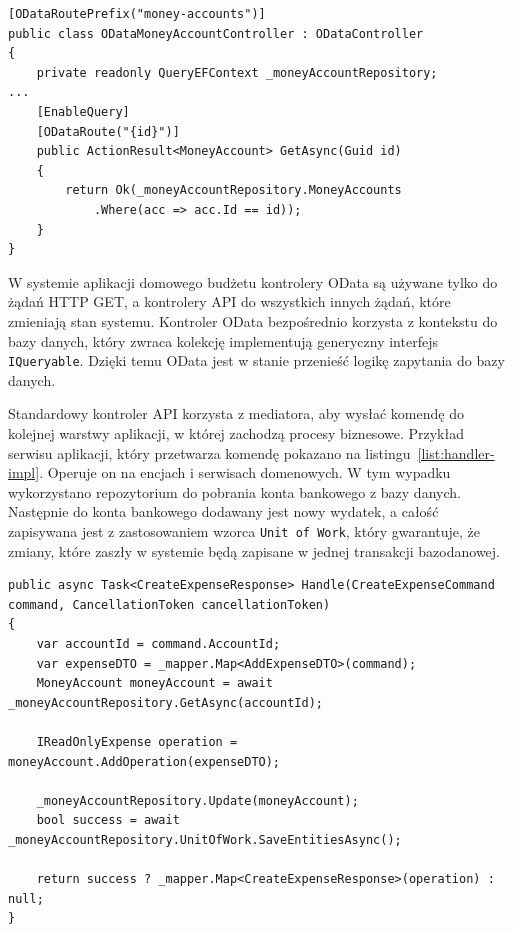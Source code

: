 {\belowcaptionskip=-10pt
\begin{lstlisting}[label=list:odata-ctrl-1,
    caption=Przykład implementacji kontrolera OData]
[ODataRoutePrefix("money-accounts")]
public class ODataMoneyAccountController : ODataController
{
    private readonly QueryEFContext _moneyAccountRepository;
...
    [EnableQuery]
    [ODataRoute("{id}")]
    public ActionResult<MoneyAccount> GetAsync(Guid id)
    {
        return Ok(_moneyAccountRepository.MoneyAccounts
            .Where(acc => acc.Id == id));
    }
}
\end{lstlisting}
}

W systemie aplikacji domowego budżetu kontrolery OData są używane tylko do żądań HTTP GET, a kontrolery API do wszystkich innych żądań, które zmieniają stan systemu.
Kontroler OData bezpośrednio korzysta z kontekstu do bazy danych, który zwraca kolekcję implementują generyczny interfejs \texttt{IQueryable}. Dzięki temu OData jest w stanie przenieść logikę zapytania do bazy danych.

Standardowy kontroler API korzysta z mediatora, aby wysłać komendę do kolejnej warstwy aplikacji, w której zachodzą procesy biznesowe. Przykład serwisu aplikacji, który przetwarza komendę pokazano na listingu~\ref{list:handler-impl}. Operuje on na encjach i serwisach domenowych. W tym wypadku wykorzystano repozytorium do pobrania konta bankowego z bazy danych. Następnie do konta bankowego dodawany jest nowy wydatek, a całość zapisywana jest z zastosowaniem wzorca \texttt{Unit of Work}, który gwarantuje, że zmiany, które zaszły w systemie będą zapisane w jednej transakcji bazodanowej. 

{\belowcaptionskip=-10pt
\begin{lstlisting}[label=list:handler-impl,
    caption=Przykład implementacji handlera aplikacji]
public async Task<CreateExpenseResponse> Handle(CreateExpenseCommand command, CancellationToken cancellationToken)
{
    var accountId = command.AccountId;
    var expenseDTO = _mapper.Map<AddExpenseDTO>(command);
    MoneyAccount moneyAccount = await _moneyAccountRepository.GetAsync(accountId);

    IReadOnlyExpense operation = moneyAccount.AddOperation(expenseDTO);

    _moneyAccountRepository.Update(moneyAccount);
    bool success = await _moneyAccountRepository.UnitOfWork.SaveEntitiesAsync();

    return success ? _mapper.Map<CreateExpenseResponse>(operation) : null;
}
\end{lstlisting}
}

